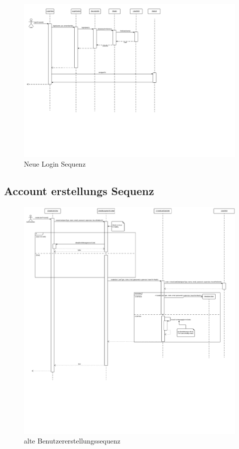 \begin{figure}
  \centering
    \includegraphics[width=\linewidth]{Login-Sequenz-new.svg}
   \caption{Neue Login Sequenz}
\end{figure}

\subsection{Account erstellungs Sequenz}

\begin{figure}
  \centering
    \includegraphics[width=\linewidth]{Create-user-account.svg}
   \caption{alte Benutzererstellungssequenz}
\end{figure}

